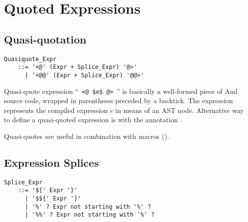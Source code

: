 \section{Quoted Expressions}
\label{sec:syntactic-forms}






\subsection{Quasi-quotation}
\label{sec:quasi-quotation}

\grammar\begin{lstlisting}
Quasiquote_Expr 
    ::= '<@' (Expr + Splice_Expr) '@>'
      | '<@@' (Expr + Splice_Expr) '@@>'
\end{lstlisting}

Quasi-quote expression ``~\lstinline!<@ $e$ @>!~'' is basically a well-formed piece of Aml source code, wrapped in parentheses preceded by a backtick. The expression represents the compiled expression $e$ in means of an AST node. Alternative way to define a quasi-quoted expression is with the annotation .

Quasi-quotes are useful in combination with macros (). 





\subsection{Expression Splices}
\label{sec:expression-splices}

\grammar\begin{lstlisting}[mathescape=false,deletekeywords={not,with}]
Splice_Expr
    ::= '${' Expr '}'
      | '$${' Expr '}'
      | '%' ? Expr not starting with '%' ?
      | '%%' ? Expr not starting with '%' ?
\end{lstlisting}

